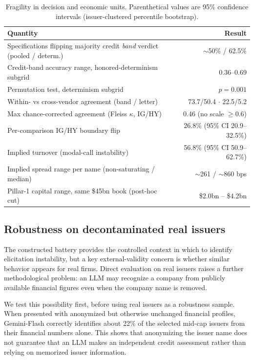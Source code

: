 \documentclass[pdflatex,sn-nature,lineno]{sn-jnl}
\theoremstyle{thmstyleone}
\begin{document}
\begin{table}[t]\centering
\caption{Fragility in decision and economic units. Parenthetical values are 95\% confidence intervals
(issuer-clustered percentile bootstrap).}\label{tab:frag}
\begin{tabular}{lr}\toprule
Quantity & Result \\\midrule
Specifications flipping majority credit \emph{band} verdict (pooled / determ.) & $\sim$50\% / 62.5\% \\
Credit-band accuracy range, honored-determinism subgrid & 0.36--0.69 \\
Permutation test, determinism subgrid & $p=0.001$ \\
Within- vs cross-vendor agreement (band / letter) & 73.7/50.4 $\cdot$ 22.5/5.2 \\
Max chance-corrected agreement (Fleiss $\kappa$, IG/HY) & 0.46 (no scale $\geq0.6$) \\
Per-comparison IG/HY boundary flip & 26.8\% (95\% CI 20.9--32.5\%) \\
Implied turnover (modal-call instability) & 56.8\% (95\% CI 50.9--62.7\%) \\
Implied spread range per name (non-saturating / median) & $\sim$261 / $\sim$860 bps \\
Pillar-1 capital range, same \$45bn book (post-hoc cut) & \$2.0bn -- \$4.2bn \\\bottomrule
\end{tabular}\end{table}

\subsection{Robustness on decontaminated real issuers}
The constructed battery provides the controlled context in which to identify elicitation instability, but
a key external-validity concern is whether similar behavior appears for real firms. Direct evaluation on
real issuers raises a further methodological problem: an LLM may recognize a company from publicly
available financial figures even when the company name is removed.

We test this possibility first, before using real issuers as a robustness sample. When presented with anonymized
but otherwise unchanged financial profiles, Gemini-Flash correctly identifies about 22\% of the selected
mid-cap issuers from their financial numbers alone. This shows that anonymizing the issuer name does not
guarantee that an LLM makes an independent credit assessment rather than relying on memorized issuer
information.
\end{document}
